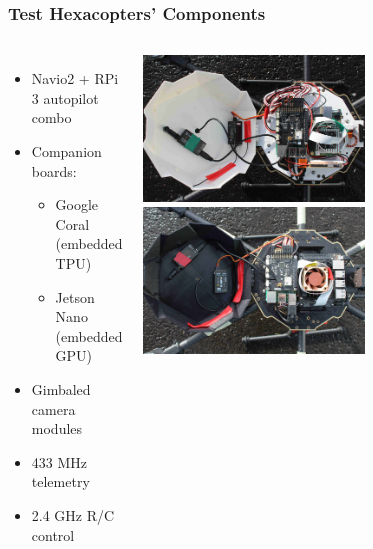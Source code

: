 \documentclass[aspectratio=169]{rubeamer}
\begin{document}
\begin{frame}
  \frametitle{Test Hexacopters' Components}
  \begin{columns}
    \begin{itemize}
      \item Navio2 + RPi 3 autopilot combo
      \item Companion boards:
      \begin{itemize}
        \item Google Coral (embedded TPU)
        \item Jetson Nano (embedded GPU)
      \end{itemize}
      \item Gimbaled camera modules
      \item 433 MHz telemetry
      \item 2.4 GHz R/C control
    \end{itemize}
    \centering
    \includegraphics[width=0.6\textwidth]{coral_electronics}\\
    \includegraphics[width=0.6\textwidth]{jetson_electronics}\\
  \end{columns}
\end{frame}
\end{document}
